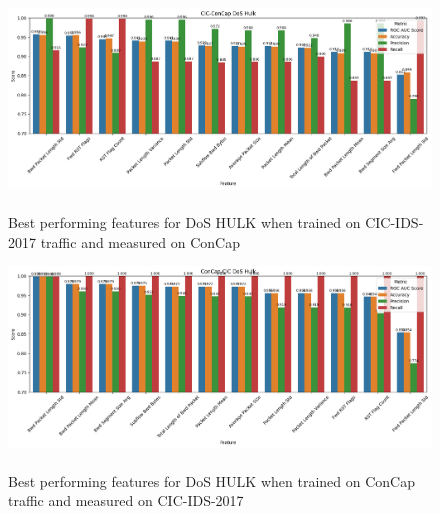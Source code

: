 \begin{figure}
	\centering
	\includegraphics[width=1.2\linewidth]{images/hulk_cic_concap}
	\caption{\\Best performing features for DoS HULK when trained on CIC-IDS-2017 traffic and measured on ConCap}
	\label{fig:hulk_cic_concap}
\end{figure}
\begin{figure}
	\centering
	\includegraphics[width=1.2\linewidth]{images/hulk_concap_cic}
	\caption{\\Best performing features for DoS HULK when trained on ConCap traffic and measured on CIC-IDS-2017}
	\label{fig:hulk_concap_cic}
\end{figure}


